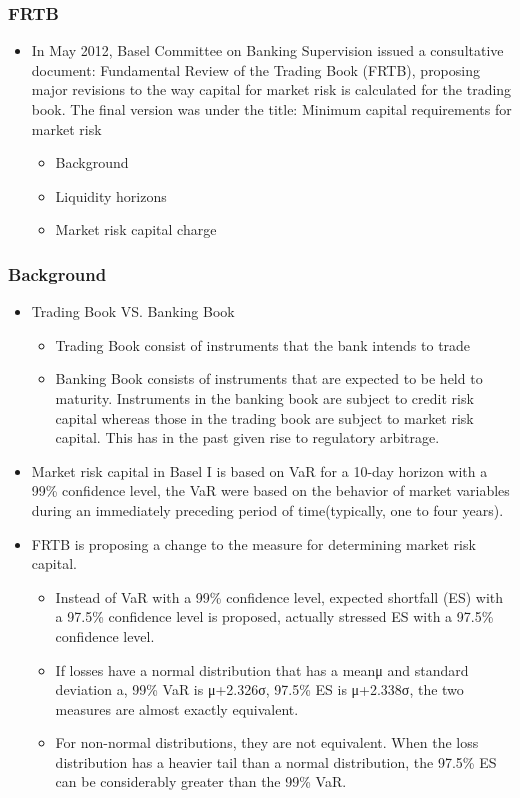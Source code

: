 \subsubsection{FRTB}
\begin{itemize}
\item In May 2012, Basel Committee on Banking Supervision issued a consultative document: Fundamental Review of the Trading Book (FRTB), proposing major revisions to the way capital for market risk is calculated for the trading book. The final version was under the title: Minimum capital requirements for market risk
    \begin{itemize}
    \item Background
    \item Liquidity horizons
    \item Market risk capital charge
    \end{itemize}
\end{itemize}


\subsubsection{Background}
\begin{itemize}
\item Trading Book VS. Banking Book

    \begin{itemize}
    \item Trading Book consist of instruments that the bank intends to trade
    \item Banking Book consists of instruments that are expected to be held to maturity.
    Instruments in the banking book are subject to credit risk capital whereas those in the trading book are subject to market risk capital. This has in the past given rise to regulatory arbitrage.
    \end{itemize}
    
\item Market risk capital in Basel I is based on VaR for a 10-day horizon with a 99\% confidence level, the VaR were based on the behavior of market variables during an immediately preceding period of time(typically, one to four years).
\item FRTB is proposing a change to the measure for determining market risk capital.
    \begin{itemize}
    \item Instead of VaR with a 99\% confidence level, expected shortfall (ES) with a 97.5\% confidence level is proposed, actually stressed ES with a 97.5\% confidence level.
    \item If losses have a normal distribution that has a meanμ and standard deviation a, 99\% VaR is μ+2.326σ, 97.5\% ES is μ+2.338σ, the two measures are almost exactly equivalent.
    \item For non-normal distributions, they are not equivalent. When the loss distribution has a heavier tail than a normal distribution, the 97.5\% ES can be considerably greater than the 99\% VaR.
    \end{itemize}
\end{itemize}


